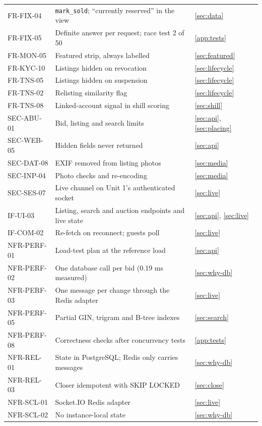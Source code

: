 \documentclass[11pt,a4paper]{article}
\begin{document}
{\begin{longtable}{@{}>{\ttfamily}p{2.4cm}>{\raggedright\arraybackslash}p{10.6cm}>{\raggedright\arraybackslash}p{2.2cm}@{}}
FR-FIX-04 & \texttt{mark\_sold}; ``currently reserved'' in the view & \ref{sec:data} \\
FR-FIX-05 & Definite answer per request; race test 2 of 50 & \ref{app:tests} \\
FR-MON-05 & Featured strip, always labelled & \ref{sec:featured} \\
FR-KYC-10 & Listings hidden on revocation & \ref{sec:lifecycle} \\
FR-TNS-05 & Listings hidden on suspension & \ref{sec:lifecycle} \\
FR-TNS-02 & Relisting similarity flag & \ref{sec:lifecycle} \\
FR-TNS-08 & Linked-account signal in shill scoring & \ref{sec:shill} \\
SEC-ABU-01 & Bid, listing and search limits & \ref{sec:api}, \ref{sec:placing} \\
SEC-WEB-05 & Hidden fields never returned & \ref{sec:api} \\
SEC-DAT-08 & EXIF removed from listing photos & \ref{sec:media} \\
SEC-INP-04 & Photo checks and re-encoding & \ref{sec:media} \\
SEC-SES-07 & Live channel on Unit 1's authenticated socket & \ref{sec:live} \\
IF-UI-03 & Listing, search and auction endpoints and live state & \ref{sec:api}, \ref{sec:live} \\
IF-COM-02 & Re-fetch on reconnect; guests poll & \ref{sec:live} \\
NFR-PERF-01 & Load-test plan at the reference load & \ref{sec:api} \\
NFR-PERF-02 & One database call per bid (0.19 ms measured) & \ref{sec:why-db} \\
NFR-PERF-03 & One message per change through the Redis adapter & \ref{sec:live} \\
NFR-PERF-05 & Partial GIN, trigram and B-tree indexes & \ref{sec:search} \\
NFR-PERF-08 & Correctness checks after concurrency tests & \ref{app:tests} \\
NFR-REL-01 & State in PostgreSQL; Redis only carries messages & \ref{sec:why-db} \\
NFR-REL-03 & Closer idempotent with SKIP LOCKED & \ref{sec:close} \\
NFR-SCL-01 & Socket.IO Redis adapter & \ref{sec:live} \\
NFR-SCL-02 & No instance-local state & \ref{sec:why-db} \\

\end{longtable}}
\end{document}
